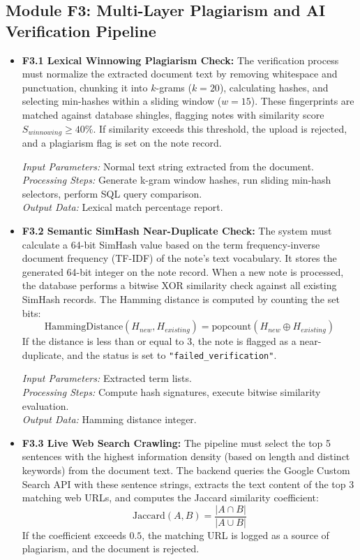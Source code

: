\documentclass[12,Times new Roman,a4paper]{report}
\begin{document}
\subsection{Module F3: Multi-Layer Plagiarism and AI Verification Pipeline}
\begin{itemize}
    \item \textbf{F3.1 Lexical Winnowing Plagiarism Check:} The verification process must normalize the extracted document text by removing whitespace and punctuation, chunking it into $k$-grams ($k=20$), calculating hashes, and selecting min-hashes within a sliding window ($w=15$). These fingerprints are matched against database shingles, flagging notes with similarity score $S_{winnowing} \ge 40\%$. If similarity exceeds this threshold, the upload is rejected, and a plagiarism flag is set on the note record.
    
    \textit{Input Parameters:} Normal text string extracted from the document. \\
    \textit{Processing Steps:} Generate k-gram window hashes, run sliding min-hash selectors, perform SQL query comparison. \\
    \textit{Output Data:} Lexical match percentage report.
    
    \item \textbf{F3.2 Semantic SimHash Near-Duplicate Check:} The system must calculate a 64-bit SimHash value based on the term frequency-inverse document frequency (TF-IDF) of the note's text vocabulary. It stores the generated 64-bit integer on the note record. When a new note is processed, the database performs a bitwise XOR similarity check against all existing SimHash records. The Hamming distance is computed by counting the set bits:
    \begin{equation}
    \text{HammingDistance}(H_{new}, H_{existing}) = \text{popcount}(H_{new} \oplus H_{existing})
    \end{equation}
    If the distance is less than or equal to 3, the note is flagged as a near-duplicate, and the status is set to \texttt{"failed\_verification"}.
    
    \textit{Input Parameters:} Extracted term lists. \\
    \textit{Processing Steps:} Compute hash signatures, execute bitwise similarity evaluation. \\
    \textit{Output Data:} Hamming distance integer.
    
    \item \textbf{F3.3 Live Web Search Crawling:} The pipeline must select the top 5 sentences with the highest information density (based on length and distinct keywords) from the document text. The backend queries the Google Custom Search API with these sentence strings, extracts the text content of the top 3 matching web URLs, and computes the Jaccard similarity coefficient:
    \begin{equation}
    \text{Jaccard}(A, B) = \frac{|A \cap B|}{|A \cup B|}
    \end{equation}
    If the coefficient exceeds $0.5$, the matching URL is logged as a source of plagiarism, and the document is rejected.
    

\end{itemize}
\end{document}
